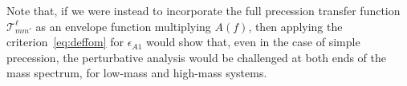 \documentclass[aps,showpacs,twocolumn,
prd,superscriptaddress,nofootinbib]{revtex4-1}
\newcommand\calT{{\mathcal{T}}}
\begin{document}
Note that, if we were instead to incorporate the full precession transfer function $\calT^{\ell}_{mm'}$ as an envelope function multiplying $A(f)$, then applying the criterion~\eqref{eq:deffom} for $\epsilon_{A1}$ would show that, even in the case of simple precession, the perturbative analysis would be challenged at both ends of the mass spectrum, for low-mass and high-mass systems.


%

\end{document}
